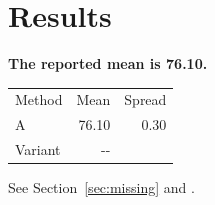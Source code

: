 \documentclass{article}
\begin{document}
\section{Results}\label{sec:results}
\textbf{The reported mean is 76.10.}
\begin{tabular}{lrr}
Method & Mean & Spread \\
A & 76.10 & 0.30 \\
Variant & -{}- & \\
\end{tabular}
\par{}
See Section~\ref{sec:missing} and \cite{missing2024}.
\par{}
\end{document}
